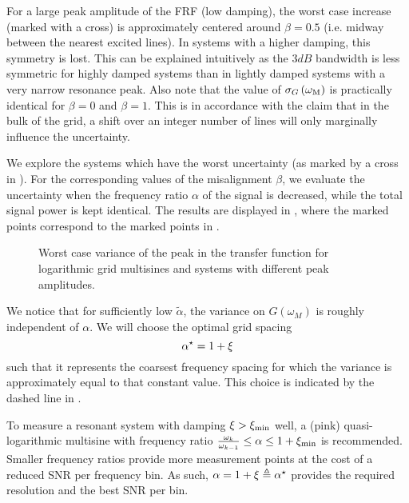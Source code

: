   For a large peak amplitude of the \gls{FRF} (low damping), the worst case increase (marked with a cross) is approximately centered around $\beta = 0.5$ (i.e. midway between the nearest excited lines).
  In systems with a higher damping, this symmetry is lost.
  This can be explained intuitively as the $3\unit{dB}$ bandwidth is less symmetric for highly damped systems than in lightly damped systems with a very narrow resonance peak.
  Also note that the value of $\sigma_G\left(\wM \right)$ is practically identical for $\beta=0$ and $\beta=1$.
  This is in accordance with the claim that in the bulk of the grid, a shift over an integer number of lines will only marginally influence the uncertainty.
  
  We explore the systems which have the worst uncertainty (as marked by a cross in ).
  For the corresponding values of the misalignment $\beta$, we evaluate the uncertainty when the frequency ratio $\alpha$ of the signal is decreased, while the total signal power is kept identical.
  The results are displayed in , where the marked points correspond to the marked points in .
  
  \begin{figure}
    \centering
      \setlength{}
      \setlength\figureheight{0.68\figurewidth}
    
    \caption[Worst-case variance $\sigma_G^2\left( \wM \right)$ as a function of the frequency ratio $\alpha$.]{Worst case variance of the peak in the transfer function for logarithmic
             grid multisines and systems with different peak amplitudes.}
    \label{fig:excitation:worstCaseAlpha}
  \end{figure}

  We notice that for sufficiently low $\tilde{\alpha}$, the variance on $G\left( \omega_M \right)$ is roughly independent of $\alpha$.
  We will choose the optimal grid spacing
  \begin{equation}
    \alpha^{\star} = 1 + \damping
    \label{eq:excitation:optimAlpha}
  \end{equation}
  such that it represents the coarsest frequency spacing for which the variance is approximately equal to that constant value.
  This choice is indicated by the dashed line in .

   \begin{guideline}
   To measure a resonant system with damping $\damping > \damping[\min]$ well, a (pink) quasi-logarithmic multisine with frequency ratio $\frac{\omega_k}{\omega_{k-1}} \leq \alpha \leq 1 + \damping[\min]$ is recommended.
   Smaller frequency ratios provide more measurement points at the cost of a reduced \gls{SNR} per frequency bin.
   As such, $\alpha = 1 + \damping \isdef \alpha^{\star}$ provides the required resolution and the best \gls{SNR} per bin.
\end{guideline}

